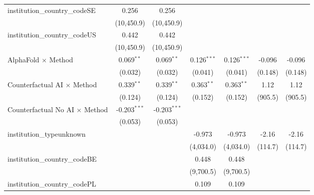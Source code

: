 \begin{tabular}{lcccccc}
   institution\_country\_codeSE          & 0.256          & 0.256          &               &               &               &   \\   
                                         & (10,450.9)     & (10,450.9)     &               &               &               &   \\   
   institution\_country\_codeUS          & 0.442          & 0.442          &               &               &               &   \\   
                                         & (10,450.9)     & (10,450.9)     &               &               &               &   \\   
   AlphaFold $\times$ Method             & 0.069$^{**}$   & 0.069$^{**}$   & 0.126$^{***}$ & 0.126$^{***}$ & -0.096        & -0.096\\   
                                         & (0.032)        & (0.032)        & (0.041)       & (0.041)       & (0.148)       & (0.148)\\   
   Counterfactual AI $\times$ Method     & 0.339$^{**}$   & 0.339$^{**}$   & 0.363$^{**}$  & 0.363$^{**}$  & 1.12          & 1.12\\   
                                         & (0.124)        & (0.124)        & (0.152)       & (0.152)       & (905.5)       & (905.5)\\   
   Counterfactual No AI $\times$ Method  & -0.203$^{***}$ & -0.203$^{***}$ &               &               &               &   \\   
                                         & (0.053)        & (0.053)        &               &               &               &   \\   
   institution\_typeunknown              &                &                & -0.973        & -0.973        & -2.16         & -2.16\\   
                                         &                &                & (4,034.0)     & (4,034.0)     & (114.7)       & (114.7)\\   
   institution\_country\_codeBE          &                &                & 0.448         & 0.448         &               &   \\   
                                         &                &                & (9,700.5)     & (9,700.5)     &               &   \\   
   institution\_country\_codePL          &                &                & 0.109         & 0.109         &               &   \\   

\end{tabular}
